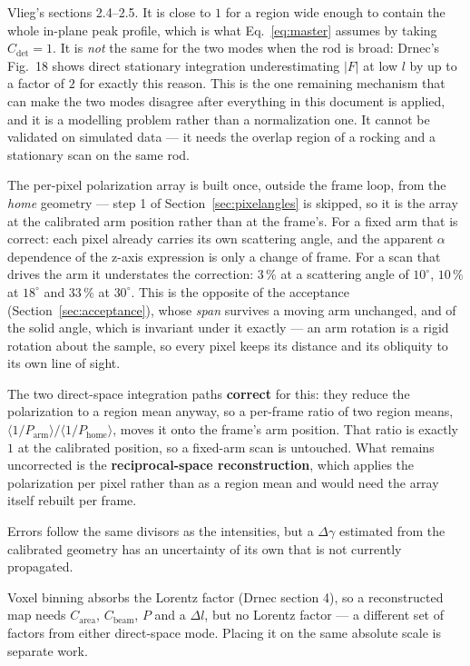 \documentclass[11pt,a4paper]{article}
\newcommand{\dgam}{\Delta\gamma}
\newcommand{\Cdet}{C_{\mathrm{det}}}
\newcommand{\Carea}{C_{\mathrm{area}}}
\newcommand{\Cbeam}{C_{\mathrm{beam}}}
\begin{document}
\begin{description}[leftmargin=0pt,style=unboxed]
\item[$\Cdet$, the in-plane detector acceptance.] Vlieg's sections 2.4--2.5.
  It is close to $1$ for a region wide enough to contain the whole in-plane
  peak profile, which is what Eq.~\eqref{eq:master} assumes by taking
  $\Cdet = 1$. It is \emph{not} the same for the two modes when the rod is
  broad: Drnec's Fig.~18 shows direct stationary integration underestimating
  $|F|$ at low $l$ by up to a factor of $2$ for exactly this reason. This is
  the one remaining mechanism that can make the two modes disagree after
  everything in this document is applied, and it is a modelling problem rather
  than a normalization one. It cannot be validated on simulated data --- it
  needs the overlap region of a rocking and a stationary scan on the same rod.

\item[The polarization at a moving detector arm, in the reconstruction.] The
  per-pixel polarization array is built once, outside the frame loop, from the
  \emph{home} geometry --- step 1 of Section~\ref{sec:pixelangles} is skipped,
  so it is the array at the calibrated arm position rather than at the
  frame's. For a fixed arm that is correct: each pixel already carries its own
  scattering angle, and the apparent $\alpha$ dependence of the z-axis
  expression is only a change of frame. For a scan that drives the arm it
  understates the correction: $3\,\%$ at a scattering angle of $10^{\circ}$,
  $10\,\%$ at $18^{\circ}$ and $33\,\%$ at $30^{\circ}$. This is the opposite
  of the acceptance (Section~\ref{sec:acceptance}), whose \emph{span} survives
  a moving arm unchanged, and of the solid angle, which is invariant under it
  exactly --- an arm rotation is a rigid rotation about the sample, so every
  pixel keeps its distance and its obliquity to its own line of sight.

  The two direct-space integration paths \textbf{correct} for this: they
  reduce the polarization to a region mean anyway, so a per-frame ratio of two
  region means, $\langle 1/P_{\mathrm{arm}}\rangle /
  \langle 1/P_{\mathrm{home}}\rangle$, moves it onto the frame's arm position.
  That ratio is exactly $1$ at the calibrated position, so a fixed-arm scan is
  untouched. What remains uncorrected is the \textbf{reciprocal-space
  reconstruction}, which applies the polarization per pixel rather than as a
  region mean and would need the array itself rebuilt per frame.

\item[Uncertainty of $\dgam$.] Errors follow the same divisors as the
  intensities, but a $\dgam$ estimated from the calibrated geometry has an
  uncertainty of its own that is not currently propagated.

\item[The reciprocal-space route.] Voxel binning absorbs the Lorentz factor
  (Drnec section 4), so a reconstructed map needs $\Carea$, $\Cbeam$, $P$ and
  a $\Delta l$, but no Lorentz factor --- a different set of factors from
  either direct-space mode. Placing it on the same absolute scale is separate
  work.
\end{description}
\end{document}
